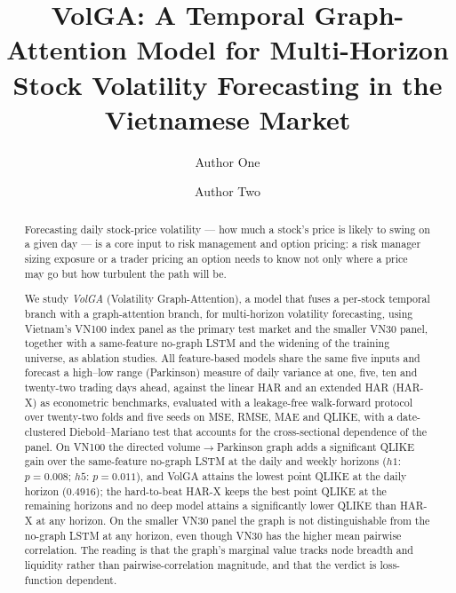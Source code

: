 \documentclass[runningheads]{llncs}
\begin{document}
\title{VolGA: A Temporal Graph-Attention Model for Multi-Horizon Stock Volatility Forecasting in the Vietnamese Market}

\author{Author One \and Author Two}

\maketitle

\begin{abstract}
Forecasting daily stock-price volatility --- how much a stock's price is likely to swing on a given
day --- is a core input to risk management and option pricing: a risk manager sizing exposure or a
trader pricing an option needs to know not only where a price may go but how turbulent the path will
be.

We study \emph{VolGA} (Volatility Graph-Attention), a model that fuses a per-stock temporal branch
with a graph-attention branch, for multi-horizon volatility forecasting, using Vietnam's VN100 index
panel as the primary test market and the smaller VN30 panel, together with a same-feature no-graph
LSTM and the widening of the training universe, as ablation studies. All feature-based models share
the same five inputs and forecast a high--low range (Parkinson) measure of daily variance at one,
five, ten and twenty-two trading days ahead, against the linear HAR and an extended HAR (HAR-X) as
econometric benchmarks, evaluated with a leakage-free walk-forward protocol over twenty-two folds and
five seeds on MSE, RMSE, MAE and QLIKE, with a date-clustered Diebold--Mariano test that accounts for
the cross-sectional dependence of the panel. On VN100 the directed volume$\to$Parkinson graph adds a
significant QLIKE gain over the same-feature no-graph LSTM at the daily and weekly horizons
($h1$: $p=0.008$; $h5$: $p=0.011$), and VolGA attains the lowest point QLIKE at the daily horizon
($0.4916$); the hard-to-beat HAR-X keeps the best point QLIKE at the remaining horizons and no deep
model attains a significantly lower QLIKE than HAR-X at any horizon. On the smaller VN30 panel the
graph is not distinguishable from the no-graph LSTM at any horizon, even though VN30 has the higher
mean pairwise correlation. The reading is that the graph's marginal value tracks node breadth and
liquidity rather than pairwise-correlation magnitude, and that the verdict is loss-function dependent.
\end{abstract}
\end{document}
